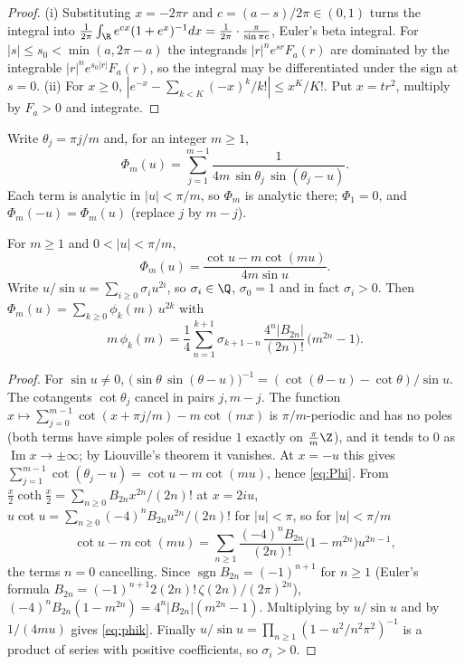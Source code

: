 \begin{proof}
(i) Substituting $x=-2\pi r$ and $c=(a-s)/2\pi\in(0,1)$ turns the integral into
$\frac1{2\pi}\int_\R e^{cx}(1+e^x)^{-1}dx=\frac1{2\pi}\cdot\frac\pi{\sin\pi c}$, Euler's beta integral.
For $|s|\le s_0<\min(a,2\pi-a)$ the integrands $|r|^ne^{sr}F_a(r)$ are dominated by the integrable
$|r|^ne^{s_0|r|}F_a(r)$, so the integral may be differentiated under the sign at $s=0$.
(ii) For $x\ge0$, $|e^{-x}-\sum_{k<K}(-x)^k/k!|\le x^K/K!$. Put $x=tr^2$, multiply by $F_a>0$ and
integrate.
\end{proof}

Write $\theta_j=\pi j/m$ and, for an integer $m\ge1$,
\[
  \Phi_m(u)=\sum_{j=1}^{m-1}\frac1{4m\,\sin\theta_j\,\sin(\theta_j-u)} .
\]
Each term is analytic in $|u|<\pi/m$, so $\Phi_m$ is analytic there; $\Phi_1=0$, and
$\Phi_m(-u)=\Phi_m(u)$ (replace $j$ by $m-j$).

\begin{lemma}\label{lem:Phi}
For $m\ge1$ and $0<|u|<\pi/m$,
\begin{equation}\label{eq:Phi}
  \Phi_m(u)=\frac{\cot u-m\cot(mu)}{4m\sin u}.
\end{equation}
Write $u/\sin u=\sum_{i\ge0}\sigma_iu^{2i}$, so $\sigma_i\in\Q$, $\sigma_0=1$ and in fact $\sigma_i>0$.
Then $\Phi_m(u)=\sum_{k\ge0}\phi_k(m)\,u^{2k}$ with
\begin{equation}\label{eq:phik}
  m\,\phi_k(m)=\frac14\sum_{n=1}^{k+1}\sigma_{k+1-n}\,\frac{4^n|B_{2n}|}{(2n)!}\,\big(m^{2n}-1\big).
\end{equation}
\end{lemma}

\begin{proof}
For $\sin u\ne0$, $\big(\sin\theta\,\sin(\theta-u)\big)^{-1}=(\cot(\theta-u)-\cot\theta)/\sin u$. The
cotangents $\cot\theta_j$ cancel in pairs $j,m-j$. The function $x\mapsto\sum_{j=0}^{m-1}\cot(x+\pi j/m)-m\cot(mx)$
is $\pi/m$-periodic and has no poles (both terms have simple poles of residue $1$ exactly on
$\frac\pi m\Z$), and it tends to $0$ as $\operatorname{Im}x\to\pm\infty$; by Liouville's theorem it
vanishes. At $x=-u$ this gives $\sum_{j=1}^{m-1}\cot(\theta_j-u)=\cot u-m\cot(mu)$, hence
\eqref{eq:Phi}. From $\frac x2\coth\frac x2=\sum_{n\ge0}B_{2n}x^{2n}/(2n)!$ at $x=2iu$,
$u\cot u=\sum_{n\ge0}(-4)^nB_{2n}u^{2n}/(2n)!$ for $|u|<\pi$, so for $|u|<\pi/m$
\[
  \cot u-m\cot(mu)=\sum_{n\ge1}\frac{(-4)^nB_{2n}}{(2n)!}\big(1-m^{2n}\big)u^{2n-1},
\]
the terms $n=0$ cancelling. Since $\operatorname{sgn}B_{2n}=(-1)^{n+1}$ for $n\ge1$ (Euler's formula
$B_{2n}=(-1)^{n+1}2(2n)!\,\zeta(2n)/(2\pi)^{2n}$), $(-4)^nB_{2n}(1-m^{2n})=4^n|B_{2n}|(m^{2n}-1)$.
Multiplying by $u/\sin u$ and by $1/(4mu)$ gives \eqref{eq:phik}. Finally
$u/\sin u=\prod_{n\ge1}(1-u^2/n^2\pi^2)^{-1}$ is a product of series with positive
coefficients, so $\sigma_i>0$.
\end{proof}

